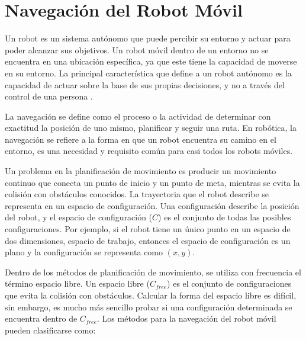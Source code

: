 \section{Navegación del Robot Móvil}

Un robot es un sistema autónomo que puede percibir su entorno y actuar para poder
alcanzar sus objetivos. Un robot móvil dentro de un entorno no se encuentra en una 
ubicación específica, ya que este tiene la capacidad de moverse en su entorno. La 
principal característica que define a un robot autónomo es la capacidad de actuar 
sobre la base de sus propias decisiones, y no a través del control de una 
persona \cite{mataric2007robotics}.

La navegación se define como el proceso o la actividad de determinar con exactitud 
la posición de uno mismo, planificar y seguir una ruta. En robótica, la navegación 
se refiere a la forma en que un robot encuentra su camino en el entorno, es una 
necesidad y requisito común para casi todos los robots móviles. %

Un problema en la planificación de movimiento es producir un movimiento 
continuo que conecta un punto de inicio y un punto de meta, mientras se evita 
la colisión con obstáculos conocidos. La trayectoria que el robot describe 
se representa en un espacio de configuración. Una configuración describe 
la posición del robot, y el espacio de configuración ($C$) es el conjunto 
de todas las posibles configuraciones. Por ejemplo, si el robot tiene 
un único punto en un espacio de dos dimensiones, espacio de trabajo, entonces 
el espacio de configuración es un plano y la configuración se representa 
como $(x,y)$.

Dentro de los métodos de planificación de movimiento, se utiliza con 
frecuencia el término espacio libre. Un espacio libre ($C_{free}$) es el 
conjunto de configuraciones que evita la colisión con obstáculos. Calcular 
la forma del espacio libre es difícil, sin embargo, es mucho más sencillo 
probar si una configuración determinada se encuentra dentro de $C_{free}$. Los 
métodos para la navegación del robot móvil pueden clasificarse como:


